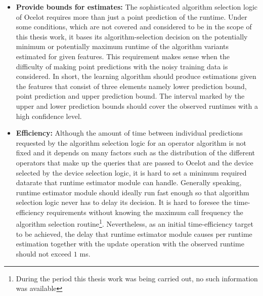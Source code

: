 \begin{itemize}
\item \textbf{Provide bounds for estimates:} The sophisticated algorithm selection logic of Ocelot requires more than just a point prediction of the runtime. Under some conditions, which are not covered and considered to be in the scope of this thesis work, it bases its algorithm-selection decision on the potentially minimum or potentially maximum runtime of the algorithm variants estimated for given features. This requirement makes sense when the difficulty of making point predictions with the noisy training data is considered. In short, the learning algorithm should produce estimations given the features that consist of three elements namely lower prediction bound, point prediction and upper prediction bound. The interval marked by the upper and lower prediction bounds should cover the observed runtimes with a high confidence level.
\item \textbf{Efficiency:} Although the amount of time between individual predictions requested by the algorithm selection logic for an operator algorithm is not fixed and it depends on many factors such as the distribution of the different operators that make up the queries that are passed to Ocelot and the device selected by the device selection logic, it is hard to set a minimum required datarate that runtime estimator module can handle. Generally speaking, runtime estimator module should ideally run fast enough so that algorithm selection logic never has to delay its decision. It is hard to foresee the time-efficiency requirements without knowing the maximum call frequency the algorithm selection routine\footnote{During the period this thesis work was being carried out, no such information was available}. Nevertheless, as an initial time-efficiency target to be achieved, the delay that runtime estimator module causes per runtime estimation together with the update operation with the observed runtime should not exceed $1$ ms.

\end{itemize}


